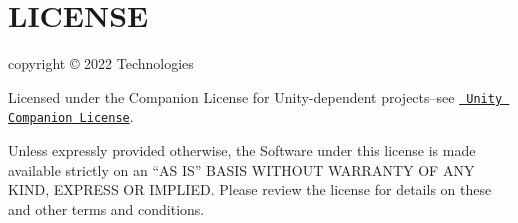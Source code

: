 \chapter{LICENSE}
\hypertarget{md__hey_tea_9_2_library_2_package_cache_2com_8unity_8timeline_0d1_87_85_2_l_i_c_e_n_s_e}{}\label{md__hey_tea_9_2_library_2_package_cache_2com_8unity_8timeline_0d1_87_85_2_l_i_c_e_n_s_e}
 copyright © 2022  Technologies

Licensed under the  Companion License for Unity-\/dependent projects--see \href{http://www.unity3d.com/legal/licenses/Unity_Companion_License}{\texttt{ Unity Companion License}}.

Unless expressly provided otherwise, the Software under this license is made available strictly on an “\+AS IS” BASIS WITHOUT WARRANTY OF ANY KIND, EXPRESS OR IMPLIED. Please review the license for details on these and other terms and conditions. 